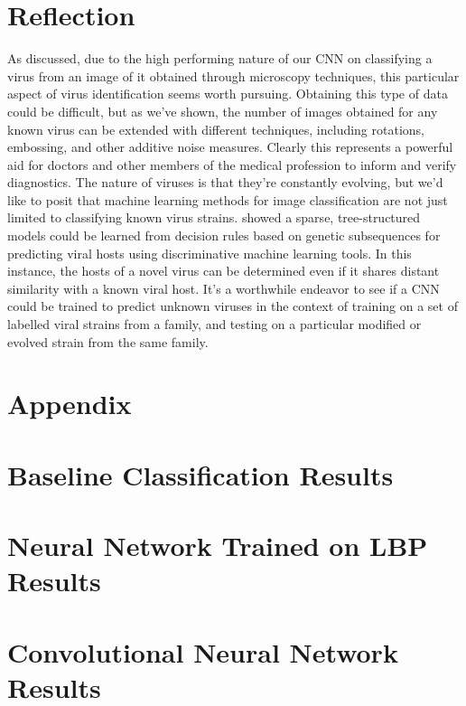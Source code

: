 \section{Reflection}
As discussed, due to the high performing nature of our CNN on classifying a virus from an image of it obtained through microscopy techniques, this particular aspect of virus identification seems worth pursuing. Obtaining this type of data could be difficult, but as we've shown, the number of images obtained for any known virus can be extended with different techniques, including rotations, embossing, and other additive noise measures. Clearly this represents a powerful aid for doctors and other members of the medical profession to inform and verify diagnostics. 
The nature of viruses is that they're constantly evolving, but we'd like to posit that machine learning methods for image classification are not just limited to classifying known virus strains. \citet{work_A} showed a sparse, tree-structured models could be learned from decision rules based on genetic subsequences for predicting viral hosts using discriminative machine learning tools. In this instance, the hosts of a novel virus can be determined even if it shares distant similarity with a known viral host.  It's a worthwhile endeavor to see if a CNN could be trained to predict unknown viruses in the context of training on a set of labelled viral strains from a family, and testing on a particular modified or evolved strain from the same family. 

\newpage
\section*{Appendix}
\appendix
\section{Baseline Classification Results}


\section{Neural Network Trained on LBP Results} \label{appendix:images}




\section{Convolutional Neural Network Results}



